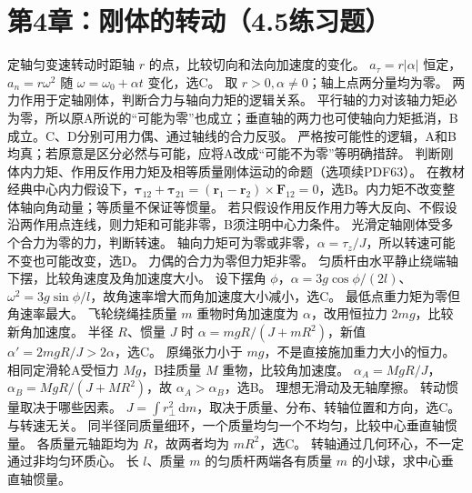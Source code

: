 \section{第4章：刚体的转动（4.5练习题）}
\problemtext 定轴匀变速转动时距轴 $r$ 的点，比较切向和法向加速度的变化。
\workings $a_\tau=r|\alpha|$ 恒定，$a_n=r\omega^2$ 随 $\omega=\omega_0+\alpha t$ 变化，选C。
\crosscheck 取 $r>0,\alpha\ne0$；轴上点两分量均为零。
\problemtext 两力作用于定轴刚体，判断合力与轴向力矩的逻辑关系。
\workings 平行轴的力对该轴力矩必为零，所以原A所说的“可能为零”也成立；垂直轴的两力也可使轴向力矩抵消，B成立。C、D分别可用力偶、通过轴线的合力反驳。
\crosscheck 严格按可能性的逻辑，A和B均真；若原意是区分必然与可能，应将A改成“可能不为零”等明确措辞。
\problemtext 判断刚体内力矩、作用反作用力矩及相等质量刚体运动的命题（选项续PDF63）。
\workings 在教材经典中心内力假设下，$\bm\tau_{12}+\bm\tau_{21}=(\bm r_1-\bm r_2)\times\bm F_{12}=0$，选B。内力矩不改变整体轴向角动量；等质量不保证等惯量。
\crosscheck 若只假设作用反作用力等大反向、不假设沿两作用点连线，则力矩和可能非零，B须注明中心力条件。
\problemtext 光滑定轴刚体受多个合力为零的力，判断转速。
\workings 轴向力矩可为零或非零，$\alpha=\tau_z/J$，所以转速可能不变也可能改变，选D。
\crosscheck 力偶的合力为零但力矩非零。
\problemtext 匀质杆由水平静止绕端轴下摆，比较角速度及角加速度大小。
\workings 设下摆角 $\phi$，$\alpha=3g\cos\phi/(2l)$、$\omega^2=3g\sin\phi/l$，故角速率增大而角加速度大小减小，选C。
\crosscheck 最低点重力矩为零但角速率最大。
\problemtext 飞轮绕绳挂质量 $m$ 重物时角加速度为 $\alpha$，改用恒拉力 $2mg$，比较新角加速度。
\workings 半径 $R$、惯量 $J$ 时 $\alpha=mgR/(J+mR^2)$，新值 $\alpha'=2mgR/J>2\alpha$，选C。
\crosscheck 原绳张力小于 $mg$，不是直接施加重力大小的恒力。
\problemtext 相同定滑轮A受恒力 $Mg$，B挂质量 $M$ 重物，比较角加速度。
\workings $\alpha_A=MgR/J$，$\alpha_B=MgR/(J+MR^2)$，故 $\alpha_A>\alpha_B$，选B。
\crosscheck 理想无滑动及无轴摩擦。
\problemtext 转动惯量取决于哪些因素。
\workings $J=\int r_\perp^2\,\mathrm dm$，取决于质量、分布、转轴位置和方向，选C。
\crosscheck 与转速无关。
\problemtext 同半径同质量细环，一个质量均匀一个不均匀，比较中心垂直轴惯量。
\workings 各质量元轴距均为 $R$，故两者均为 $mR^2$，选C。
\crosscheck 转轴通过几何环心，不一定通过非均匀环质心。
\problemtext 长 $l$、质量 $m$ 的匀质杆两端各有质量 $m$ 的小球，求中心垂直轴惯量。
